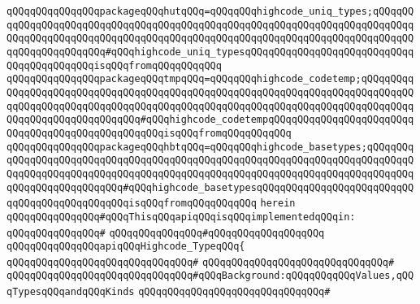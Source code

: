 \verb|qQQqqQQqqQQqqQQqpackageqQQqhutqQQq=qQQqqQQqhighcode_uniq_types;qQQqqQQqqQQqqQQqqQQqqQQqqQQqqQQqqQQqqQQqqQQqqQQqqQQqqQQqqQQqqQQqqQQqqQQqqQQqqQQqqQQqqQQqqQQqqQQqqQQqqQQqqQQqqQQqqQQqqQQqqQQqqQQqqQQqqQQqqQQqqQQqqQQqqQQqqQQqqQQqqQQq#qQQqhighcode_uniq_typesqQQqqQQqqQQqqQQqqQQqqQQqqQQqqQQqqQQqqQQqqQQqisqQQqfromqQQqqQQqqQQq|\newline
\verb|qQQqqQQqqQQqqQQqpackageqQQqtmpqQQq=qQQqqQQqhighcode_codetemp;qQQqqQQqqQQqqQQqqQQqqQQqqQQqqQQqqQQqqQQqqQQqqQQqqQQqqQQqqQQqqQQqqQQqqQQqqQQqqQQqqQQqqQQqqQQqqQQqqQQqqQQqqQQqqQQqqQQqqQQqqQQqqQQqqQQqqQQqqQQqqQQqqQQqqQQqqQQqqQQqqQQqqQQqqQQq#qQQqhighcode_codetempqQQqqQQqqQQqqQQqqQQqqQQqqQQqqQQqqQQqqQQqqQQqqQQqqQQqisqQQqfromqQQqqQQqqQQq|\newline
\verb|qQQqqQQqqQQqqQQqpackageqQQqhbtqQQq=qQQqqQQqhighcode_basetypes;qQQqqQQqqQQqqQQqqQQqqQQqqQQqqQQqqQQqqQQqqQQqqQQqqQQqqQQqqQQqqQQqqQQqqQQqqQQqqQQqqQQqqQQqqQQqqQQqqQQqqQQqqQQqqQQqqQQqqQQqqQQqqQQqqQQqqQQqqQQqqQQqqQQqqQQqqQQqqQQqqQQqqQQq#qQQqhighcode_basetypesqQQqqQQqqQQqqQQqqQQqqQQqqQQqqQQqqQQqqQQqqQQqqQQqisqQQqfromqQQqqQQqqQQq|\newline
\verb|herein|\newline
\newline
\verb|qQQqqQQqqQQqqQQq#qQQqThisqQQqapiqQQqisqQQqimplementedqQQqin:|\newline
\verb|qQQqqQQqqQQqqQQq#|\newline
\verb|qQQqqQQqqQQqqQQq#qQQqqQQqqQQqqQQqqQQq|\newline
\newline
\verb|qQQqqQQqqQQqqQQqapiqQQqHighcode_TypeqQQq{|\newline
\verb|qQQqqQQqqQQqqQQqqQQqqQQqqQQqqQQq#|\newline
\verb|qQQqqQQqqQQqqQQqqQQqqQQqqQQqqQQq#|\newline
\newline
\verb|qQQqqQQqqQQqqQQqqQQqqQQqqQQqqQQq#qQQqBackground:qQQqqQQqqQQqValues,qQQqTypesqQQqandqQQqKinds|\newline
\verb|qQQqqQQqqQQqqQQqqQQqqQQqqQQqqQQq#|\newline
